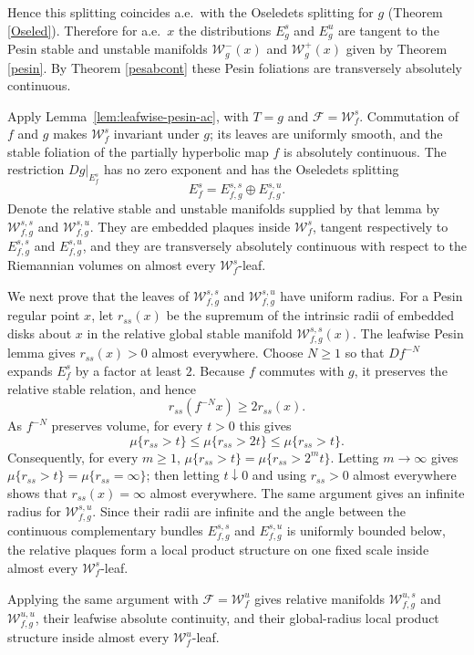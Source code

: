 \documentclass[11pt]{amsart}
\numberwithin{equation}{section}
\theoremstyle{plain}
\begin{document}
Hence this splitting coincides a.e.\ with the Oseledets splitting for $g$
(Theorem \ref{Oseled}). Therefore for a.e.\ $x$ the distributions $E^s_g$
and $E^u_g$ are tangent to the Pesin stable and unstable manifolds
$\mathcal W^-_g(x)$ and $\mathcal W^+_g(x)$ given by Theorem
\ref{pesin}. By Theorem \ref{pesabcont} these Pesin foliations are
transversely absolutely continuous.


Apply Lemma~\ref{lem:leafwise-pesin-ac}, with
$T=g$ and $\mathcal F=\mathcal W_f^s$.  Commutation of $f$ and $g$ makes
$\mathcal W_f^s$ invariant under $g$; its leaves are uniformly smooth,
and the stable foliation of the partially hyperbolic map $f$ is absolutely
continuous.  The restriction $Dg|_{E_f^s}$ has no zero exponent and has
the Oseledets splitting
\[
 E_f^s=E^{s,s}_{f,g}\oplus E^{s,u}_{f,g}.
\]
Denote the relative stable and unstable manifolds supplied by that lemma
by $\mathcal W^{s,s}_{f,g}$ and $\mathcal W^{s,u}_{f,g}$.  They are
embedded plaques inside $\mathcal W_f^s$, tangent respectively to
$E^{s,s}_{f,g}$ and $E^{s,u}_{f,g}$, and they are transversely absolutely
continuous with respect to the Riemannian volumes on almost every
$\mathcal W_f^s$-leaf. 

We next prove that the leaves of $\mathcal W^{s,s}_{f,g}$ and $\mathcal W^{s,u}_{f,g}$ have uniform radius.  For a Pesin regular point $x$, let $r_{ss}(x)$ be the
supremum of the intrinsic radii of embedded disks about $x$ in the
relative global stable manifold $\mathcal W^{s,s}_{f,g}(x)$.  The
leafwise Pesin lemma gives $r_{ss}(x)>0$ almost everywhere.  Choose
$N\ge1$ so that $Df^{-N}$ expands $E_f^s$ by a factor at least $2$.
Because $f$ commutes with $g$, it preserves the relative stable relation,
and hence
\[
 r_{ss}(f^{-N}x)\ge2r_{ss}(x).
\]
As $f^{-N}$ preserves volume, for every $t>0$ this gives
\[
 \mu\{r_{ss}>t\}\le\mu\{r_{ss}>2t\}\le\mu\{r_{ss}>t\}.
\]
Consequently, for every $m\ge1$,
$\mu\{r_{ss}>t\}=\mu\{r_{ss}>2^mt\}$.  Letting $m\to\infty$ gives
$\mu\{r_{ss}>t\}=\mu\{r_{ss}=\infty\}$; then letting $t\downarrow0$ and
using $r_{ss}>0$ almost everywhere shows that
$r_{ss}(x)=\infty$ almost everywhere.  The same argument gives an
infinite radius for $\mathcal W^{s,u}_{f,g}$. Since their
radii are infinite and the angle between the continuous complementary
bundles $E^{s,s}_{f,g}$ and $E^{s,u}_{f,g}$ is uniformly bounded below,
the relative plaques form a local product structure on one fixed scale
inside almost every $\mathcal W_f^s$-leaf.

Applying the same argument with $\mathcal F=\mathcal W_f^u$ gives
relative manifolds $\mathcal W^{u,s}_{f,g}$ and
$\mathcal W^{u,u}_{f,g}$, their leafwise absolute continuity, and their
global-radius local product structure inside almost every
$\mathcal W_f^u$-leaf.
\end{document}
